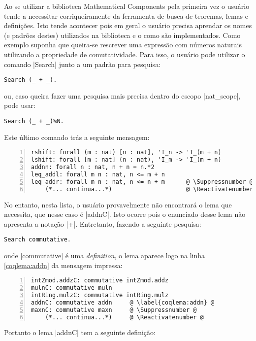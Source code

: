 Ao se utilizar a biblioteca Mathematical Components pela primeira vez o usuário tende a necessitar corriqueiramente da ferramenta de busca de teoremas, lemas e definições. Isto tende acontecer pois em geral o usuário precisa aprendar os nomes (e padrões destes) utilizados na biblioteca e o como são implementados. Como exemplo suponha que queira-se rescrever uma expressão com números naturais utilizando a propriedade de comutatividade. Para isso, o usuário pode utilizar o comando \coqinline|Search| junto a um padrão para pesquisa:
    \begin{lstlisting}[language=coq,frame=single,tabsize=1]
Search (_ + _).
    \end{lstlisting}
ou, caso queira fazer uma pesquisa mais precisa dentro do escopo \coqinline|nat_scope|, pode usar:
    \begin{lstlisting}[language=coq,frame=single,tabsize=1]
Search (_ + _)%N.
    \end{lstlisting}
Este último comando trás a seguinte mensagem:
    \begin{lstlisting}[language=coq-error,frame=single,tabsize=1, escapechar=@, escapechar=@, numbers=left]
rshift: forall (m : nat) [n : nat], 'I_n -> 'I_(m + n)
lshift: forall [m : nat] (n : nat), 'I_m -> 'I_(m + n)
addnn: forall n : nat, n + n = n.*2
leq_addl: forall m n : nat, n <= m + n
leq_addr: forall m n : nat, n <= n + m      @ \Suppressnumber @
    (*... continua...*)                     @ \Reactivatenumber @
    \end{lstlisting}
No entanto, nesta lista, o usuário provavelmente não encontrará o lema que necessita, que nesse caso é \coqinline|addnC|. Isto ocorre pois o enunciado desse lema não apresenta a notação \coqinline|+|. Entretanto, fazendo a seguinte pesquisa:
    \begin{lstlisting}[language=coq,frame=single,tabsize=1]
Search commutative.
    \end{lstlisting}
onde \coqinline|commutative| é uma \textit{definition},
o lema aparece logo na linha \ref{coqlema:addn} da mensagem impressa: 
    \begin{lstlisting}[language=coq-error,frame=single,tabsize=1, escapechar=@, numbers=left]
intZmod.addzC: commutative intZmod.addz
mulnC: commutative muln
intRing.mulzC: commutative intRing.mulz
addnC: commutative addn     @ \label{coqlema:addn} @
maxnC: commutative maxn     @ \Suppressnumber @
    (*... continua...*)     @ \Reactivatenumber @
    \end{lstlisting}
Portanto o lema \coqinline|addnC| tem a seguinte definição:
